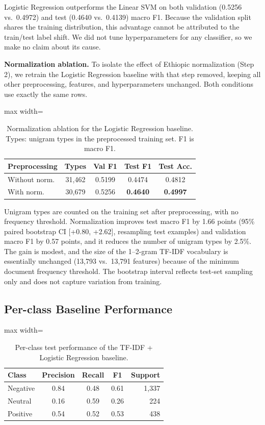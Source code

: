 Logistic Regression outperforms the Linear SVM on both validation (0.5256 vs.~0.4972) and test (0.4640 vs.~0.4139) macro F1. Because the validation split shares the training distribution, this advantage cannot be attributed to the train/test label shift. We did not tune hyperparameters for any classifier, so we make no claim about its cause.

\textbf{Normalization ablation.} To isolate the effect of Ethiopic normalization (Step 2), we retrain the Logistic Regression baseline with that step removed, keeping all other preprocessing, features, and hyperparameters unchanged. Both conditions use exactly the same rows.

\begin{table}[t]
\centering\small
\begin{adjustbox}{max width=\linewidth}
\begin{tabular}{lcccc}
\toprule
Preprocessing & Types & Val F1 & Test F1 & Test Acc. \\
\midrule
Without norm. & 31,462 & 0.5199 & 0.4474 & 0.4812 \\
With norm. & 30,679 & 0.5256 & \textbf{0.4640} & \textbf{0.4997} \\
\bottomrule
\end{tabular}
\end{adjustbox}
\caption{Normalization ablation for the Logistic Regression baseline. Types: unigram types in the preprocessed training set. F1 is macro F1.}
\label{tab:ablation}
\end{table}

Unigram types are counted on the training set after preprocessing, with no frequency threshold. Normalization improves test macro F1 by 1.66 points (95\% paired bootstrap CI {[}+0.80, +2.62{]}, resampling test examples) and validation macro F1 by 0.57 points, and it reduces the number of unigram types by 2.5\%. The gain is modest, and the size of the 1--2-gram TF-IDF vocabulary is essentially unchanged (13,793 vs.~13,791 features) because of the minimum document frequency threshold. The bootstrap interval reflects test-set sampling only and does not capture variation from training.

\subsection{Per-class Baseline Performance}

\begin{table}[t]
\centering\small
\begin{adjustbox}{max width=\linewidth}
\begin{tabular}{lcccr}
\toprule
Class & Precision & Recall & F1 & Support \\
\midrule
Negative & 0.84 & 0.48 & 0.61 & 1,337 \\
Neutral & 0.16 & 0.59 & 0.26 & 224 \\
Positive & 0.54 & 0.52 & 0.53 & 438 \\
\bottomrule
\end{tabular}
\end{adjustbox}
\caption{Per-class test performance of the TF-IDF + Logistic Regression baseline.}
\label{tab:baseline-perclass}
\end{table}

